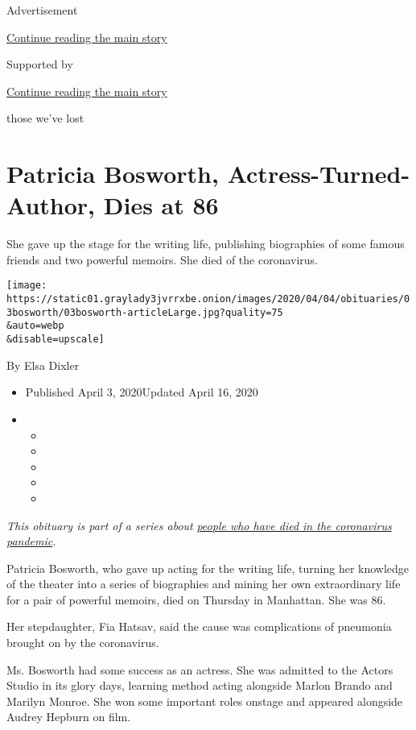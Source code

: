 Advertisement

\protect\hyperlink{after-top}{Continue reading the main story}

Supported by

\protect\hyperlink{after-sponsor}{Continue reading the main story}

those we've lost

\hypertarget{patricia-bosworth-actress-turned-author-dies-at-86}{%
\section{Patricia Bosworth, Actress-Turned-Author, Dies at
86}\label{patricia-bosworth-actress-turned-author-dies-at-86}}

She gave up the stage for the writing life, publishing biographies of
some famous friends and two powerful memoirs. She died of the
coronavirus.

\texttt{[image: https://static01.graylady3jvrrxbe.onion/images/2020/04/04/obituaries/03bosworth/03bosworth-articleLarge.jpg?quality=75\\\&auto=webp\\\&disable=upscale]}

By Elsa Dixler

\begin{itemize}
\item
  Published April 3, 2020Updated April 16, 2020
\item
  \begin{itemize}
  \item
  \item
  \item
  \item
  \item
  \end{itemize}
\end{itemize}

\emph{This obituary is part of a series about}
\href{https://www.nytimes3xbfgragh.onion/series/people-who-have-died-of-the-coronavirus}{\emph{people
who have died in the coronavirus pandemic}}\emph{.}

Patricia Bosworth, who gave up acting for the writing life, turning her
knowledge of the theater into a series of biographies and mining her own
extraordinary life for a pair of powerful memoirs, died on Thursday in
Manhattan. She was 86.

Her stepdaughter, Fia Hatsav, said the cause was complications of
pneumonia brought on by the coronavirus.

Ms. Bosworth had some success as an actress. She was admitted to the
Actors Studio in its glory days, learning method acting alongside Marlon
Brando and Marilyn Monroe. She won some important roles onstage and
appeared alongside Audrey Hepburn on film.

